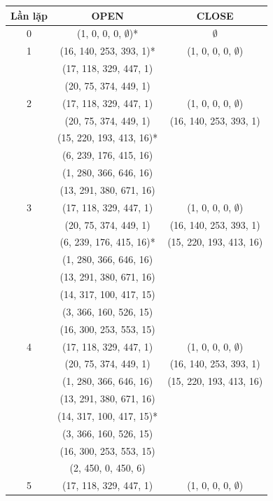 \documentclass[a4paper, 11pt]{article}
\begin{document}
\clearpage
\begin{center}
  \begin{tabular}{ |c|c|c| }
    \hline
    Lần lặp  & OPEN & CLOSE \\
    \hline
    0 & (1, 0, 0, 0, $\emptyset$)* & $\emptyset$ \\
    \hline
      1 & (16, 140, 253, 393, 1)* & (1, 0, 0, 0, $\emptyset$)\\
      & (17, 118, 329, 447, 1) & \\
      & (20, 75, 374, 449, 1) & \\
    \hline
      2 & (17, 118, 329, 447, 1)& (1, 0, 0, 0, $\emptyset$) \\ 
      & (20, 75, 374, 449, 1) & (16, 140, 253, 393, 1)\\
      & (15, 220, 193, 413, 16)*  & \\
      & (6, 239, 176, 415, 16)& \\
      & (1, 280, 366, 646, 16) & \\
      & (13, 291, 380, 671, 16) & \\
    \hline
      3 & (17, 118, 329, 447, 1) & (1, 0, 0, 0, $\emptyset$) \\
      & (20, 75, 374, 449, 1)& (16, 140, 253, 393, 1)\\
      & (6, 239, 176, 415, 16)*& (15, 220, 193, 413, 16)\\
      & (1, 280, 366, 646, 16) & \\
      & (13, 291, 380, 671, 16) & \\
      & (14, 317, 100, 417, 15) & \\
      & (3, 366, 160, 526, 15) & \\
      & (16, 300, 253, 553, 15) &\\
    \hline
      4 & (17, 118, 329, 447, 1) & (1, 0, 0, 0, $\emptyset$)\\
      & (20, 75, 374, 449, 1) & (16, 140, 253, 393, 1)\\
      & (1, 280, 366, 646, 16) & (15, 220, 193, 413, 16)\\
      & (13, 291, 380, 671, 16) & \\
      & (14, 317, 100, 417, 15)* & \\
      & (3, 366, 160, 526, 15) & \\
      & (16, 300, 253, 553, 15) &\\
      & (2, 450, 0, 450, 6) & \\
    \hline
      5 & (17, 118, 329, 447, 1) & (1, 0, 0, 0, $\emptyset$)\\

\end{tabular}
\end{center}
\end{document}
